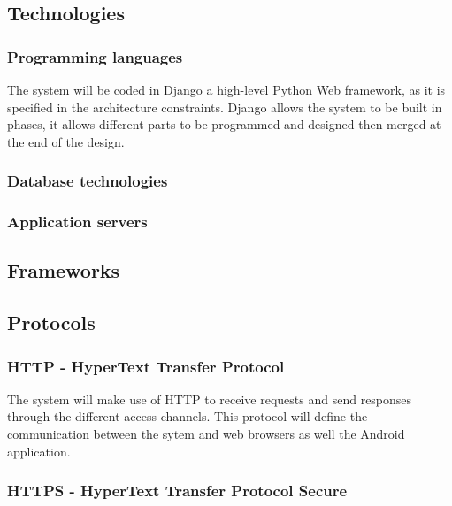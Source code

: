 \topmargin=-0.45in
\evensidemargin=0in
\oddsidemargin=0in
\textwidth=6.5in
\textheight=9.0in
\headsep=0.25in

\linespread{1.1} %
\subsection{Technologies}
\subsubsection{Programming languages}

The system will be coded in Django a high-level Python Web framework, as it is specified in the architecture constraints. Django allows the system to be built in phases, it allows different parts to be programmed and designed then merged at the end of the design. 

\subsubsection{Database technologies}



\subsubsection{Application servers}


\subsection{Frameworks}
\subsection{Protocols}

\subsubsection{HTTP - HyperText Transfer Protocol}

The system will make use of HTTP to receive requests and send responses through the different access channels. This protocol will define the communication 
between the sytem and web browsers as well the Android application.

\subsubsection{HTTPS - HyperText Transfer Protocol Secure}

